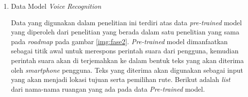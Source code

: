 	\begin{enumerate}
	\item Data Model \textit{Voice Recognition}
	\par Data yang digunakan dalam penelitian ini terdiri atas data \textit{pre-trained} model yang diperoleh dari penelitian yang berada dalam satu penelitian yang sama pada \textit{roadmap} pada gambar \ref{img:fase2}. \textit{Pre-trained} model dimanfaatkan sebagai titik awal untuk merespons perintah suara dari pengguna, kemudian perintah suara akan di terjemahkan ke dalam bentuk teks yang akan diterima oleh \textit{smartphone} pengguna. Teks yang diterima akan digunakan sebagai input yang akan menjadi lokasi tujuan serta pemilihan rute. Berikut adalah \textit{list} dari nama-nama ruangan yang ada pada data \textit{Pre-trained} model.


\end{enumerate}
